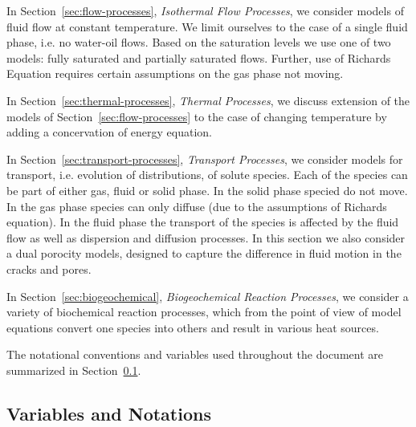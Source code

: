 In Section~\ref{sec:flow-processes}, \emph{Isothermal Flow Processes}, 
we consider models of fluid flow at constant temperature.
We limit ourselves to the case of a single fluid phase, i.e. no water-oil flows.
Based on the saturation levels we use one of two models:
fully saturated and partially saturated flows.
Further, use of Richards Equation requires certain assumptions on the gas phase not moving.

In Section~\ref{sec:thermal-processes}, \emph{Thermal Processes},
we discuss extension of the models of Section~\ref{sec:flow-processes}
to the case of changing temperature by adding a concervation of energy equation.


In Section~\ref{sec:transport-processes}, \emph{Transport Processes},
we consider models for transport, i.e. evolution of distributions, of solute species. 
Each of the species can be part of either gas, fluid or solid phase.
In the solid phase specied do not move.
In the gas phase species can only diffuse (due to the assumptions of Richards equation).
In the fluid phase the transport of the species is affected by the 
fluid flow as well as dispersion and diffusion processes. 
In this section we also consider a dual porocity models,
designed to capture the difference in fluid motion in the cracks and pores.  
 

In Section~\ref{sec:biogeochemical}, \emph{Biogeochemical Reaction Processes},
we consider a variety of biochemical reaction processes,
which from the point of view of model equations
convert one species into others and result in various heat sources.
  

The notational conventions and variables used throughout the document 
are summarized in Section~\ref{sec:notations}.




\subsection{Variables and Notations}
\label{sec:notations}


\def\bnabla{{\boldsymbol{\nabla}}}
\def\bg{{\boldsymbol{g}}}
\def\bq{{\boldsymbol{q}}}
\def\bx{{\boldsymbol{x}}}
\def\bJ{{\boldsymbol{J}}}
\def\K{{\mathbb K}}

\def\Frac{\displaystyle \frac}

\def\ucdot{{\,\cdot\,}}
\def\ukg{{\rm kg}}
\def\um{{\rm m}}
\def\us{{\rm s}}
\def\umol{{\rm mol}}
\def\upa{{\rm Pa}}


